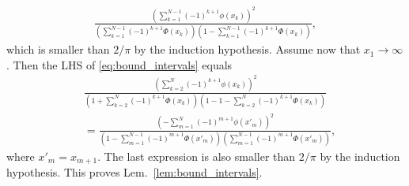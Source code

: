 \documentclass[letterpaper, conference]{IEEEtran}      %
\begin{document}
\begin{align*}
\frac{ \left(  \sum_{k=1}^{N-1} (-1)^{k+1}\phi(x_k) \right)^2} 
{\left( \sum_{k=1}^{N-1} (-1)^{k+1} \Phi(x_k) \right)\left(1- \sum_{k=1}^{N-1} (-1)^{k+1} \Phi(x_k)  \right) } ,
\end{align*}
which is smaller than $2/\pi$ by the induction hypothesis. Assume now that $x_1 \rightarrow \infty$. Then the LHS of
\eqref{eq:bound_intervals} equals
\begin{align*}
& \frac{ \left(  \sum_{k=2}^{N} (-1)^{k+1}\phi(x_k) \right)^2} 
{\left( 1 + \sum_{k=2}^{N} (-1)^{k+1} \Phi(x_k) \right)\left(1- 1 - \sum_{k=2}^{N} (-1)^{k+1} \Phi(x_k)  \right) }  \\
& = \frac{ \left(  -\sum_{m=1}^{N} (-1)^{m+1}\phi(x'_m) \right)^2} 
{\left( 1 - \sum_{m=1}^{N-1} (-1)^{m+1} \Phi(x'_{m}) \right)\left( \sum_{m=1}^{N-1} (-1)^{m+1} \Phi(x'_{m})  \right) },
\end{align*}
where $x'_{m} = x_{m+1}$. The last expression is also smaller than $2/\pi$ by the induction hypothesis. This proves Lem.~\ref{lem:bound_intervals}. \\
\end{document}
